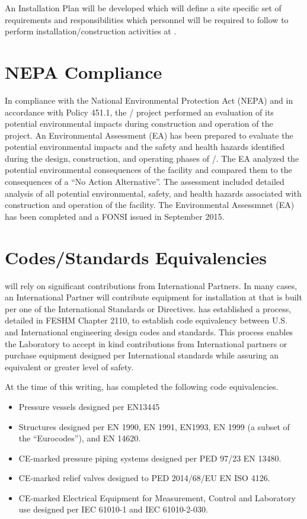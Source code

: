 An Installation  Plan will be developed
which will define a site specific set of  requirements and
responsibilities which personnel will be required to follow to perform
installation/construction activities at \surf.

\section{NEPA Compliance}

In compliance with the National Environmental Protection Act (NEPA)
and in accordance with  Policy 451.1, the / project
performed an evaluation of its potential environmental impacts during
construction and operation of the project.  An Environmental
Assessment (EA) has been prepared to evaluate the potential
environmental impacts and the safety and health hazards identified
during the design, construction, and operating phases of /.
The EA analyzed the potential environmental consequences of the
facility and compared them to the consequences of a ``No Action
Alternative''. The assessment included detailed analysis of all
potential environmental, safety, and health hazards associated with
construction and operation of the facility.  The Environmental
Assessmnet (EA) has been completed and a FONSI issued in September
2015.

\section{Codes/Standards Equivalencies}

 will rely on significant contributions from International
Partners. In many cases, an International Partner will contribute
equipment for installation at \fnal that is built per one of the
International Standards or Directives. \fnal has established a
process, detailed in FESHM Chapter 2110, to establish code equivalency
between U.S. and International engineering design codes and
standards. This process enables the Laboratory to accept in kind
contributions from International partners or purchase equipment
designed per International standards while assuring an equivalent or
greater level of safety.

At the time of this writing, \fnal has completed the following code
equivalencies.
\begin{itemize}
 \item Pressure vessels designed per EN13445
 \item Structures designed per EN 1990, EN 1991, EN1993, EN 1999 (a
   subset of the ``Eurocodes''), and EN 14620.
 \item CE-marked pressure piping systems designed per PED 97/23 EN 13480.
 \item CE-marked relief valves designed to PED 2014/68/EU EN ISO 4126.
 \item CE-marked Electrical Equipment for Measurement, Control and
   Laboratory use designed per IEC 61010-1 and IEC 61010-2-030.
\end{itemize}

